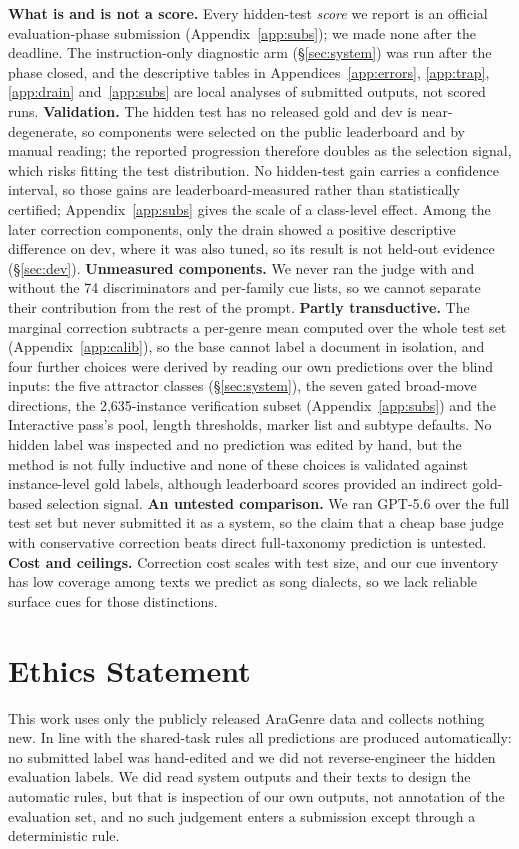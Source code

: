 \documentclass[11pt]{article}
\begin{document}
\textbf{What is and is not a score.} Every hidden-test \emph{score} we report is an official
evaluation-phase submission (Appendix~\ref{app:subs}); we made none after the deadline. The
instruction-only diagnostic arm (\S\ref{sec:system}) was run after the phase closed, and the
descriptive tables in Appendices~\ref{app:errors}, \ref{app:trap}, \ref{app:drain}
and~\ref{app:subs} are local analyses of submitted outputs, not scored runs.
\textbf{Validation.} The hidden test has no released gold and dev is near-degenerate, so
components were selected on the public leaderboard and by manual reading; the reported
progression therefore doubles as the selection signal, which risks fitting the test
distribution. No hidden-test gain carries a confidence interval, so those gains are
leaderboard-measured rather than statistically certified; Appendix~\ref{app:subs} gives the
scale of a class-level effect. Among the later correction components, only the drain showed a positive descriptive difference
on dev, where it was also tuned, so its result is not held-out evidence (\S\ref{sec:dev}). \textbf{Unmeasured
components.} We never ran the judge with and without the 74 discriminators and per-family cue
lists, so we cannot separate their contribution from the rest of the prompt.
\textbf{Partly transductive.} The marginal correction subtracts a per-genre mean computed over
the whole test set (Appendix~\ref{app:calib}), so the base cannot label a document in isolation,
and four further choices were derived by reading our own predictions over the blind inputs: the
five attractor classes (\S\ref{sec:system}), the seven gated broad-move directions, the
2{,}635-instance verification subset (Appendix~\ref{app:subs}) and the Interactive pass's pool,
length thresholds, marker list and subtype defaults. No hidden label was inspected and no
prediction was edited by hand, but the method is not fully inductive and none of these choices is
validated against instance-level gold labels, although leaderboard scores provided an indirect
gold-based selection signal.
\textbf{An untested comparison.} We ran GPT-5.6 over the full test set but never submitted it as
a system, so the claim that a cheap base judge with conservative correction beats direct
full-taxonomy prediction is untested. \textbf{Cost and ceilings.} Correction cost scales with
test size, and our cue inventory has low coverage among texts we predict as song dialects, so we
lack reliable surface cues for those distinctions.

\section*{Ethics Statement}
This work uses only the publicly released AraGenre data and collects nothing new. In line with
the shared-task rules all predictions are produced automatically: no submitted label was
hand-edited and we did not reverse-engineer the hidden evaluation labels. We did read system
outputs and their texts to design the automatic rules, but that is inspection of our own
outputs, not annotation of the evaluation set, and no such judgement enters a submission except
through a deterministic rule.
\end{document}

